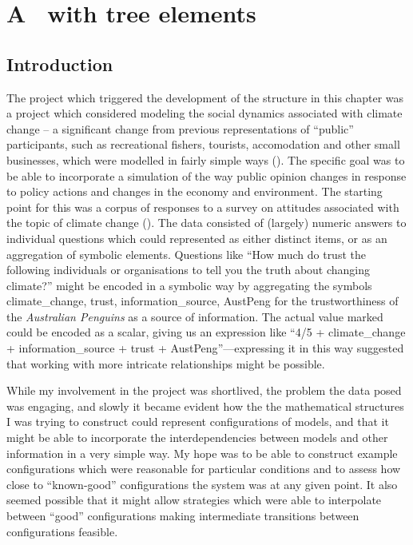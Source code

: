 \chapter[A \CRING\ WITH TREE ELEMENTS] {A \cring\ with tree elements}\label{treering}
\WeAreOn{\cfour}
\section{Introduction}
The project which triggered the development of the structure in this
chapter was a project which considered modeling the social dynamics
associated with climate change -- a significant change from previous
representations of ``public'' participants, such as recreational
fishers, tourists, accomodation and other small businesses, which were
modelled in fairly simple ways (\cite{Fulton2011ningaloo,Gray2014}).
The specific goal was to be able to incorporate a simulation of the
way public opinion changes in response to policy actions and changes
in the economy and environment.  The starting point for this was a
corpus of responses to a survey on attitudes associated with the topic
of climate change (\cite{boschetti2012}). The data consisted of
(largely) numeric answers to individual questions which could
represented as either distinct items, or as an aggregation of symbolic
elements.  Questions like ``How much do trust the following
individuals or organisations to tell you the truth about changing
climate?'' might be encoded in a symbolic way by aggregating the
symbols \textsf{climate\_change, trust, information\_source, AustPeng}
for the trustworthiness of the \emph{Australian Penguins} as a source
of information. The actual value marked could be encoded as a scalar,
giving us an expression like ``\textsf{4/5 + climate\_change +
information\_source + trust + AustPeng}''---expressing it in this way
suggested that working with more intricate relationships might be
possible.

While my involvement in the project was shortlived, the problem the
data posed was engaging, and slowly it became evident how the the
mathematical structures I was trying to construct could represent
configurations of models, and that it might be able to incorporate
the interdependencies between models and other information in a very
simple way.  My hope was to be able to construct example
configurations which were reasonable for particular conditions and to
assess how close to ``known-good'' configurations the system was
at any given point.  It also seemed possible that it might allow
strategies which were able to interpolate between ``good'' 
configurations making intermediate transitions between configurations
feasible. 

